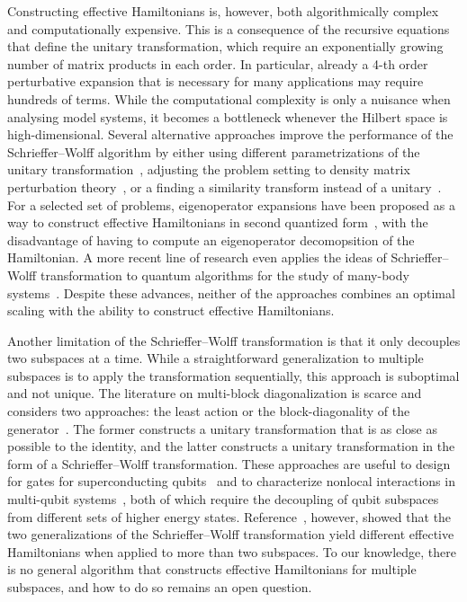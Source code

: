 Constructing effective Hamiltonians is, however, both algorithmically complex and computationally expensive.
This is a consequence of the recursive equations that define the unitary transformation, which require an exponentially growing number of matrix products in each order.
In particular, already a 4-th order perturbative expansion that is necessary for many applications may require hundreds of terms.
While the computational complexity is only a nuisance when analysing model systems, it becomes a bottleneck whenever the Hilbert space is high-dimensional.
Several alternative approaches improve the performance of the Schrieffer--Wolff algorithm by either using different parametrizations of the unitary transformation~\cite{Van_Vleck_1929, Shavitt_1980, Lowdin_1962, Klein_1974, Suzuki_1983}, adjusting the problem setting to density matrix perturbation theory~\cite{McWeeny_1962, Truflandier_2020}, or a finding a similarity transform instead of a unitary~\cite{Bloch_1958}.
For a selected set of problems, eigenoperator expansions have been proposed as a way to construct effective Hamiltonians in second quantized form~\cite{Landi_2024, Reascos_2024}, with the disadvantage of having to compute an eigenoperator decomopsition of the Hamiltonian.
A more recent line of research even applies the ideas of Schrieffer--Wolff transformation to quantum algorithms for the study of many-body systems~\cite{Wurtz_2020, Zhang_2022}.
Despite these advances, neither of the approaches combines an optimal scaling with the ability to construct effective Hamiltonians.

Another limitation of the Schrieffer--Wolff transformation is that it only decouples two subspaces at a time.
While a straightforward generalization to multiple subspaces is to apply the transformation sequentially, this approach is suboptimal and not unique.
The literature on multi-block diagonalization is scarce and considers two approaches: the least action or the block-diagonality of the generator~\cite{Mankodi_2024}.
The former constructs a unitary transformation that is as close as possible to the identity, and the latter constructs a unitary transformation in the form of a Schrieffer--Wolff transformation.
These approaches are useful to design for gates for superconducting qubits~\cite{Magesan_2020} and to characterize nonlocal interactions in multi-qubit systems~\cite{Xu_2024a}, both of which require the decoupling of qubit subspaces from different sets of higher energy states.
Reference~\cite{Mankodi_2024}, however, showed that the two generalizations of the Schrieffer--Wolff transformation yield different effective Hamiltonians when applied to more than two subspaces.
To our knowledge, there is no general algorithm that constructs effective Hamiltonians for multiple subspaces, and how to do so remains an open question.

